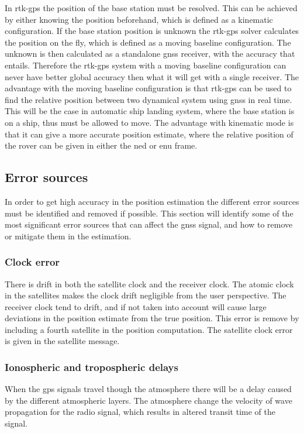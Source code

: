 In \gls{rtk-gps} the position of the base station must be resolved. This can be achieved by either knowing the position beforehand, which is defined as a kinematic configuration. If the base station position is unknown the \gls{rtk-gps} solver calculates the position on the fly, which is defined as a moving baseline configuration. The unknown is then calculated as a standalone \gls{gnss} receiver, with the accuracy that entails. Therefore the \gls{rtk-gps} system with a moving baseline configuration can never have better global accuracy then what it will get with a single receiver. The advantage with the moving baseline configuration is that \gls{rtk-gps} can be used to find the relative position between two dynamical system using \gls{gnss} in real time. This will be the case in automatic ship landing system, where the base station is on a ship, thus must be allowed to move. The advantage with kinematic mode is that it can give a more accurate position estimate, where the relative position of the rover can be given in either the \gls{ned} or \gls{enu} frame.

\subsection{Error sources}
In order to get high accuracy in the position estimation the different error sources must be identified and removed if possible. This section will identify some of the most significant error sources that can affect the \gls{gnss} signal, and how to remove or mitigate them in the estimation.
\subsubsection{Clock error}
There is drift in both the satellite clock and the receiver clock. The atomic clock in the satellites makes the clock drift negligible from the user perspective. The receiver clock tend to drift, and if not taken into account will cause large deviations in the position estimate from the true position. This error is remove by including a fourth satellite in the position computation. The satellite clock error is given in the satellite message. 

\subsubsection{Ionospheric and tropospheric delays}\label{Ss:Atmosphere}
When the \gls{gps} signals travel though the atmosphere there will be a delay caused by the different atmospheric layers. The atmosphere change the velocity of wave propagation for the radio signal, which results in altered transit time of the signal.
